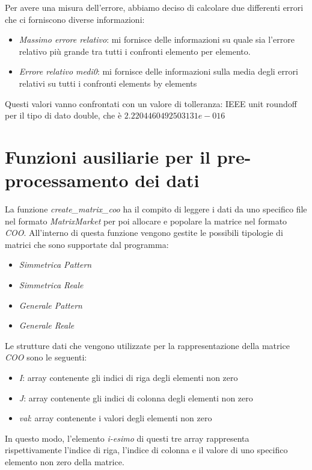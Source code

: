 \documentclass{article}
\begin{document}
Per avere una misura dell'errore, abbiamo deciso di calcolare due differenti errori che ci forniscono diverse informazioni:
\begin{itemize}
\item \textit{Massimo errore relativo}: mi fornisce delle informazioni su quale sia l'errore relativo più grande tra tutti i confronti elemento per elemento.
\item \textit{Errore relativo medi0}: mi fornisce delle informazioni sulla media degli errori relativi su tutti i confronti elements by elements 
\end{itemize}

Questi valori vanno confrontati con un valore di tolleranza: IEEE unit roundoff per il tipo di dato double, che è $2.2204460492503131e-016$ 

\section{Funzioni ausiliarie per il pre-processamento dei dati}
La funzione \textit{create\_matrix\_coo} ha il compito di leggere i dati da uno specifico file nel formato \textit{MatrixMarket} per poi allocare e popolare la matrice nel formato \textit{COO}. All'interno di questa funzione vengono gestite le possibili tipologie di matrici che sono supportate dal programma:

\begin{itemize}
\item \textit{Simmetrica Pattern}
\item \textit{Simmetrica Reale}
\item \textit{Generale Pattern}
\item \textit{Generale Reale}
\end{itemize}

Le strutture dati che vengono utilizzate per la rappresentazione della matrice \textit{COO} sono le seguenti:

\begin{itemize}
\item \textit{I}: array contenente gli indici di riga degli elementi non zero
\item\textit{J}: array contenente gli indici di colonna degli elementi non zero
\item \textit{val}: array contenente i valori degli elementi non zero
\end{itemize}

In questo modo, l'elemento \textit{i-esimo} di questi tre array rappresenta rispettivamente l'indice di riga, l'indice di colonna e il valore di uno specifico elemento non zero della matrice.
\end{document}
